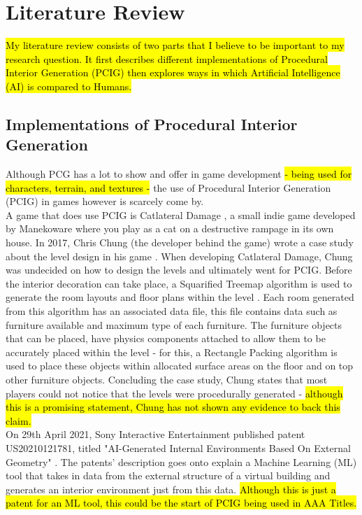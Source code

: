 \section{Literature Review}
\hl{My literature review consists of two parts that I believe to be important to my research question. It first describes different implementations of Procedural Interior Generation (PCIG) then explores ways in which Artificial Intelligence (AI) is compared to Humans.}

\subsection{Implementations of Procedural Interior Generation}
Although PCG has a lot to show and offer in game development \hl{- being used for characters, terrain, and textures -} the use of Procedural Interior Generation (PCIG) in games however is scarcely come by.
\\
A game that does use PCIG is Catlateral Damage \cite{game:catlateral},
a small indie game developed by Manekoware where you play as a cat on a destructive rampage 
in its own house. In 2017, Chris Chung (the developer behind the game) wrote a case study about the level design in his game \cite[Chapter~6]{pcg_in_gd}. When developing Catlateral Damage, Chung was undecided on how to design the levels and ultimately went for PCIG\cite[Chapter~6]{pcg_in_gd}. Before the interior decoration can take place, a Squarified Treemap algorithm is used to generate the room layouts and floor plans within the level \cite{squarified-treemap}. Each room generated from this algorithm has an associated data file, this file contains data such as furniture available and maximum type of each furniture. The furniture objects that can be placed, have physics components attached to allow them to be accurately placed within the level - for this, a Rectangle Packing algorithm \cite{rectangle-packing} is used to place these objects within allocated surface areas on the floor and on top other furniture objects. Concluding the case study, Chung states that most players could not notice that the levels were procedurally generated - \hl{although this is a promising statement, Chung has not shown any evidence to back this claim.}
\\
On 29th April 2021, Sony Interactive Entertainment published patent US20210121781, titled "AI-Generated Internal Environments Based On External Geometry" \cite{sony-patent}. The patents' description goes onto explain a Machine Learning (ML) tool that takes in data from the external structure of a virtual building and generates an interior environment just from this data. \hl{Although this is just a patent for an ML tool, this could be the start of PCIG being used in AAA Titles. }
\bigskip


